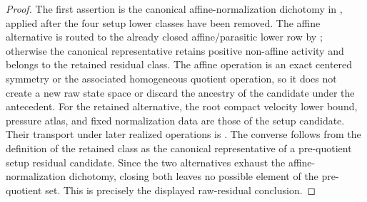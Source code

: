 \documentclass[11pt]{amsart}
\numberwithin{equation}{section}
\theoremstyle{plain}
\theoremstyle{definition}
\theoremstyle{remark}
\begin{document}
\begin{proof}
The first assertion is the canonical affine-normalization dichotomy in
,
applied after the four setup lower classes have been removed.  The affine
alternative is routed to the already closed affine/parasitic lower row by
;
otherwise the canonical representative retains positive non-affine activity
and belongs to the retained residual class.  The affine operation is an exact
centered symmetry or the associated homogeneous quotient operation, so it
does not create a new raw state space or discard the ancestry of the candidate
under the antecedent.
For the retained alternative, the root compact velocity lower bound, pressure
atlas, and fixed normalization data are those of the setup candidate.  Their
transport under later realized operations is
.
The converse follows from the definition of the retained class as the
canonical representative of a pre-quotient setup residual candidate.  Since
the two alternatives exhaust the affine-normalization dichotomy, closing both
leaves no possible element of the pre-quotient set.  This is precisely the
displayed raw-residual conclusion.
\end{proof}
\end{document}
